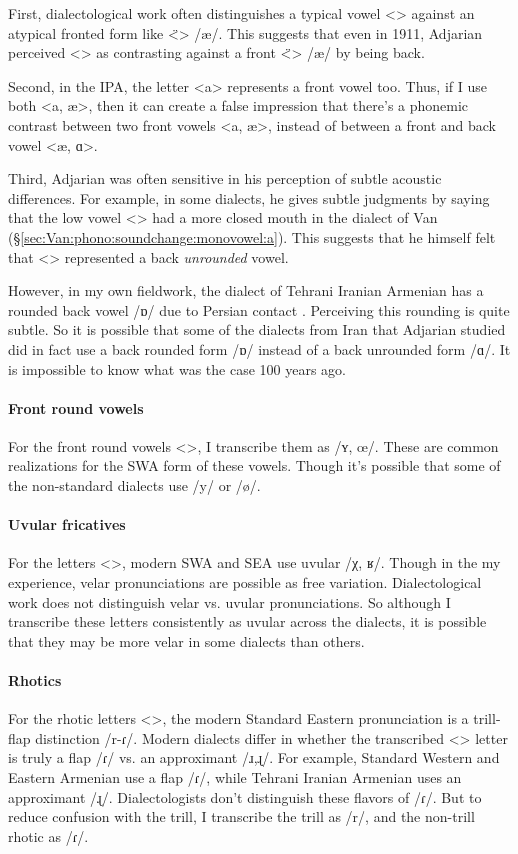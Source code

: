First, dialectological work often distinguishes a typical vowel <> against an atypical fronted form like <̈> /æ/. This suggests that even in 1911, Adjarian perceived <> as contrasting against a front <̈> /æ/ by being back. 

Second, in the IPA, the letter <a> represents a front vowel too. Thus, if I use both <a, æ>, then it can create a false impression that there's a phonemic contrast between two front vowels <a, æ>, instead of between a front and back vowel <æ, ɑ>. 

Third, Adjarian was often sensitive in his perception of subtle acoustic differences. For example, in some dialects, he gives subtle judgments by saying that the low vowel <> had a more closed mouth in the dialect of Van (\S\ref{sec:Van:phono:soundchange:monovowel:a}). This suggests that he himself felt that <> represented a back \textit{unrounded} vowel. 

However, in my own fieldwork, the dialect of Tehrani Iranian Armenian has a rounded back vowel /ɒ/ due to Persian contact \citep[\S2.1.4]{DolatianEtAl-prep-IranianGrammar}. Perceiving this rounding is quite subtle. So it is possible that some of the dialects from Iran that Adjarian studied     did in fact use a back rounded form /ɒ/ instead of a back unrounded form /ɑ/. It is impossible to know what was the case 100 years ago.
\paragraph{Front round vowels}
For the front round vowels <>, I transcribe them as /ʏ, œ/. These are common realizations for the SWA form of these vowels. Though it's possible that some of the non-standard dialects use /y/ or /ø/. 

\paragraph{Uvular fricatives}
For the letters <>, modern SWA and SEA use uvular /χ, ʁ/. Though in the my experience, velar pronunciations are possible as free variation. Dialectological work does not distinguish velar vs. uvular pronunciations. So although I transcribe these letters consistently as uvular across the dialects, it is possible that they may be more velar in some dialects than others. 

\paragraph{Rhotics}
For the rhotic letters <>, the modern Standard Eastern pronunciation is a trill-flap distinction /r-ɾ/. Modern dialects differ in whether the transcribed <> letter is truly a flap /ɾ/ vs. an approximant /ɹ,ɻ/. For example, Standard Western and Eastern Armenian use a flap /ɾ/, while Tehrani Iranian Armenian uses an approximant /ɻ/. Dialectologists don't distinguish these flavors of /ɾ/. But to reduce confusion with the trill, I transcribe the trill as /r/, and the non-trill rhotic as /ɾ/. 


